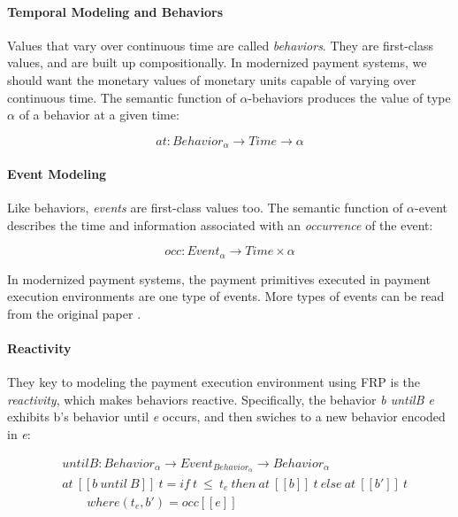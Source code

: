 \paragraph{Temporal Modeling and Behaviors}

Values that vary over continuous time are called \textit{behaviors}. They are first-class values, and are built up
compositionally. In modernized payment systems, we should want the monetary values of monetary units capable of varying over
continuous time. The semantic function of $\alpha$-behaviors produces the value of type $\alpha$ of a behavior at a given
time:

\begin{equation}
    at : Behavior_{\alpha} \rightarrow Time \rightarrow \alpha
\end{equation}

\paragraph{Event Modeling}

Like behaviors, \textit{events} are first-class values too. The semantic function of $\alpha$-event describes the time and
information associated with an \textit{occurrence} of the event:

\begin{equation}
    occ : Event_{\alpha} \rightarrow Time \times \alpha
\end{equation}

In modernized payment systems, the payment primitives executed in payment execution environments are one type of
events. More types of events can be read from the original paper .

\paragraph{Reactivity}

They key to modeling the payment execution environment using FRP is the \textit{reactivity}, which makes behaviors
reactive. Specifically, the behavior \textit{b untilB e} exhibits b's behavior until \textit{e} occurs, and then swiches
to a new behavior encoded in \textit{e}:

\begin{equation}
    \begin{split}
    &untilB : Behavior_{\alpha} \rightarrow Event_{Behavior_{\alpha}} \rightarrow Behavior_{\alpha} \\
    &at\ [\![b\ until\ B]\!]\ t = if\ t\ \leq\ t_{e}\ then\ at\ [\![b]\!]\ t\ else\ at\ [\![b']\!]\ t \\
    &\qquad where (t_e, b') = occ[\![e]\!]
    \end{split}
\end{equation}

